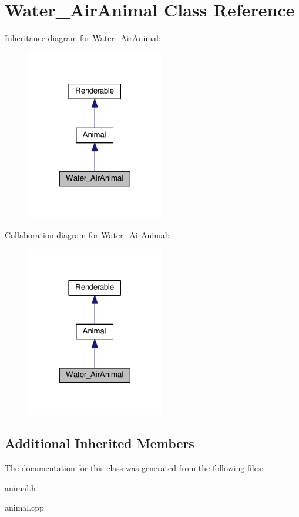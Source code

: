 \hypertarget{classWater__AirAnimal}{}\section{Water\+\_\+\+Air\+Animal Class Reference}
\label{classWater__AirAnimal}


Inheritance diagram for Water\+\_\+\+Air\+Animal\+:
\nopagebreak
\begin{figure}[H]
\begin{center}
\leavevmode
\includegraphics[width=170pt]{classWater__AirAnimal__inherit__graph}
\end{center}
\end{figure}


Collaboration diagram for Water\+\_\+\+Air\+Animal\+:
\nopagebreak
\begin{figure}[H]
\begin{center}
\leavevmode
\includegraphics[width=170pt]{classWater__AirAnimal__coll__graph}
\end{center}
\end{figure}
\subsection*{Additional Inherited Members}


The documentation for this class was generated from the following files\+:\begin{DoxyCompactItemize}
\item 
animal.\+h\item 
animal.\+cpp\end{DoxyCompactItemize}
